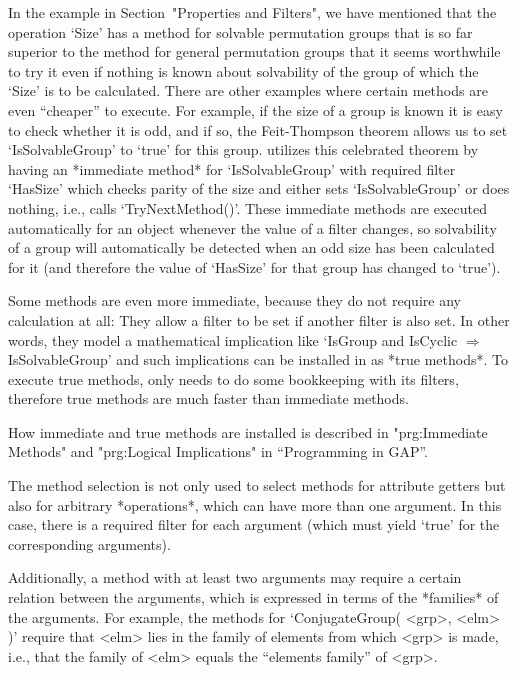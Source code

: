 In the example in Section~"Properties and Filters",
we have mentioned that the operation `Size' has a
method  for solvable permutation  groups that is  so  far superior to the
method for  general permutation groups that  it seems worthwhile to try it
even if nothing  is  known about solvability   of the group of which  the
`Size' is to   be  calculated. There are   other  examples where  certain
methods  are even ``cheaper'' to  execute. For example,  if the size of a
group is known  it is easy to check  whether  it is  odd, and  if so, the
Feit-Thompson  theorem allows us to set  `IsSolvableGroup' to `true' for
this group.   {\GAP} utilizes   this  celebrated  theorem  by  having  an
*immediate  method* for `IsSolvableGroup'  with required filter `HasSize'
which checks parity of the size and either sets `IsSolvableGroup' or does
nothing, i.e.,   calls `TryNextMethod()'.   These immediate  methods  are
executed  automatically for an  object  whenever the   value of a  filter
changes, so solvability of a group will automatically be detected when an
odd size has been calculated for it (and therefore the value of `HasSize'
for that group has changed to `true').

Some methods are  even more immediate,   because they do not  require any
calculation  at all: They  allow a filter to  be set if another filter is
also set. In other words,   they  model a mathematical implication   like
`IsGroup   and   IsCyclic    $\Rightarrow$   IsSolvableGroup'  and   such
implications  can be installed  in {\GAP}  as  *true methods*. To execute
true methods, {\GAP} only needs to do  some bookkeeping with its filters,
therefore true methods are much faster than immediate methods.

How immediate and true methods are installed is described in 
"prg:Immediate Methods" and "prg:Logical Implications"
in ``Programming in GAP''.


\null

The method selection  is not only  used to  select  methods for attribute
getters but also for arbitrary *operations*, which can have more than one
argument.  In this case,   there is a   required filter for each argument
(which must yield `true'  for the corresponding  arguments).

Additionally, a method with at least two arguments may require a certain
relation between the arguments,
which is expressed in terms of the *families* of the arguments.
For example, the methods for  `ConjugateGroup( <grp>, <elm> )'
require that <elm>  lies in the family   of elements from  which <grp> is
made, i.e., that  the family of  <elm> equals the ``elements family''  of
<grp>.

